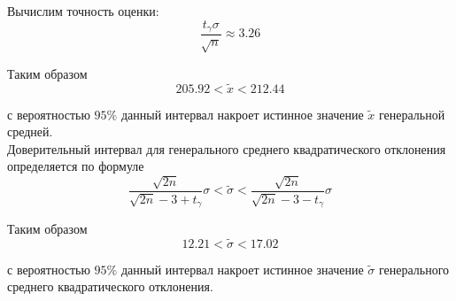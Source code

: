 \documentclass[10pt]{article}
\begin{document}
Вычислим точность оценки:
\[\frac{t_{\gamma}\sigma}{\sqrt{n}} \approx 3.26\]

Таким образом
\[205.92 < \tilde{x} < 212.44\]

с вероятностью $95\%$ данный интервал накроет истинное значение $\tilde{x}$
генеральной средней.\\

Доверительный интервал для генерального среднего квадратического отклонения
определяется по формуле
\[\frac{\sqrt{2n}}{\sqrt{2n}-3+t_{\gamma}}\sigma<\tilde{\sigma}<
\frac{\sqrt{2n}}{\sqrt{2n}-3-t_{\gamma}}\sigma\]

Таким образом
\[12.21 < \tilde{\sigma} < 17.02\]

с вероятностью $95\%$ данный интервал накроет истинное значение $\tilde{\sigma}$
генерального среднего квадратического отклонения.
\end{document}
